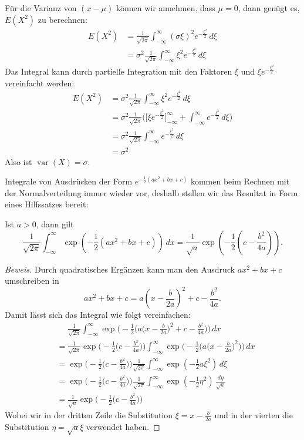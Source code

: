 Für die Varianz von $(x-\mu)$ können wir annehmen, dass $\mu=0$, dann
genügt es, $E(X^2)$ zu berechnen:
\begin{align*}
E(X^2)
&=\frac1{\sqrt{2\pi}}\int_{-\infty}^{\infty}(\sigma\xi)^2e^{-\frac{\xi^2}2}\,d\xi\\
&=\sigma^2\frac{1}{\sqrt{2\pi}}\int_{-\infty}^{\infty}\xi^2e^{-\frac{\xi^2}2}\,d\xi
\end{align*}
Das Integral kann durch partielle Integration mit den Faktoren
$\xi$ und $\xi e^{-\frac{\xi^2}2}$ vereinfacht werden:
\begin{align*}
E(X^2)
&=\sigma^2\frac{1}{\sqrt{2\pi}}\int_{-\infty}^{\infty}\xi^2e^{-\frac{\xi^2}2}\,d\xi\\
&=\sigma^2\frac{1}{\sqrt{2\pi}}\biggl(
\biggl[\xi e^{-\frac{\xi^2}2}\biggr]_{-\infty}^{\infty}
+
\int_{-\infty}^{\infty}e^{-\frac{\xi^2}2}\,d\xi
\biggr)\\
&=\sigma^2\frac{1}{\sqrt{2\pi}}
\int_{-\infty}^{\infty}e^{-\frac{\xi^2}2}\,d\xi\\
&=\sigma^2
\end{align*}
Also ist $\operatorname{var}(X)=\sigma$.

Integrale von Ausdrücken der Form
$e^{-\frac12(ax^2+bx+c)}$
kommen beim Rechnen mit der Normalverteilung immer wieder vor, deshalb
stellen wir das Resultat in Form eines Hilfssatzes bereit:
\begin{hilfssatz}
\label{exp-quadr}
Ist $a>0$, dann gilt
\[
\frac1{\sqrt{2\pi}}\int_{-\infty}^{\infty}\exp\left(-\frac12(ax^2+bx+c)\right)\,dx
=
\frac1{\sqrt{a}}\exp\left(-\frac12\left(c-\frac{b^2}{4a}\right)\right).
\]
\end{hilfssatz}
\begin{proof}[Beweis]
Durch quadratisches Ergänzen kann man den Ausdruck $ax^2+bx+c$ umschreiben in
\[
ax^2+bx+c=a\left(x-\frac{b}{2a}\right)^2+c-\frac{b^2}{4a}.
\]
Damit lässt sich das Integral wie folgt vereinfachen:
\begin{align*}
&\phantom{=}\frac1{\sqrt{2\pi}}\int_{-\infty}^{\infty}\exp\biggl(-\frac12\biggl(
a\biggl(x-\frac{b}{2a}\biggr)^2+c-\frac{b^2}{4a}
\biggr)\biggr)\,dx\\
&=\frac1{\sqrt{2\pi}}
\exp\biggl(-\frac12\biggl(
c-\frac{b^2}{4a}
\biggr)\biggr)
\int_{-\infty}^{\infty}
\exp\biggl(-\frac12\biggl(
a\biggl(x-\frac{b}{2a}\biggr)^2
\biggr)\biggr)
\,dx\\
&=
\exp\biggl(-\frac12\biggl(
c-\frac{b^2}{4a}
\biggr)\biggr)
\frac1{\sqrt{2\pi}}
\int_{-\infty}^{\infty}
\exp\left(-\frac12
a\xi^2
\right)
\,d\xi\\
&=
\exp\biggl(-\frac12\biggl(
c-\frac{b^2}{4a}
\biggr)\biggr)
\frac1{\sqrt{2\pi}}
\int_{-\infty}^{\infty}
\exp\left(-\frac12
\eta^2
\right)
\,\frac{d\eta}{\sqrt{a}}\\
&=
\frac{1}{\sqrt{a}}
\exp\biggl(-\frac12\biggl(
c-\frac{b^2}{4a}
\biggr)\biggr)
\end{align*}
Wobei wir in der dritten Zeile die Substitution $\xi=x-\frac{b}{2a}$
und in der vierten die Substitution
$\eta=\sqrt{a}\xi$
verwendet haben.
\end{proof}

